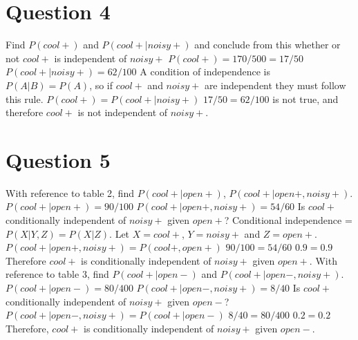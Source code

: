 \documentclass[12pt]{report}
\begin{document}
\section{Question 4}
Find $P(cool+)$ and $P(cool+|noisy+)$ and conclude from this whether or not $cool+$ is independent of $noisy+$
\newline
\newline
$P(cool+) = 170/500 = 17/50$
\newline
$P(cool+|noisy+) = 62/100$
\newline
A condition of independence is $P(A|B) = P(A)$, so if $cool+$ and $noisy+$ are independent they must follow this rule.
\newline
$P(cool+) = P(cool+|noisy+)$
\newline
$17/50 = 62/100$ is not true, and therefore $cool+$ is not independent of $noisy+$.

\section{Question 5}
With reference to table 2, find $P(cool+|open+)$, $P(cool+|open+, noisy+)$.
\newline
$P(cool+|open+)=90/100$
\newline
$P(cool+|open+,noisy+)=54/60$
\newline
Is $cool+$ conditionally independent of $noisy+$ given $open+$?
\newline
Conditional independence = $P(X|Y,Z) = P(X|Z)$.
\newline
Let $X=cool+$, $Y=noisy+$ and $Z=open+$.
\newline
$P(cool+|open+,noisy+) = P(cool+,open+)$
\newline
$90/100 = 54/60$
\newline
$0.9 = 0.9$
\newline
Therefore $cool+$ is conditionally independent of $noisy+$ given $open+$.
\newline
\newline
With reference to table 3, find $P(cool+|open-)$ and $P(cool+|open-,noisy+)$.
\newline
$P(cool+|open-) = 80/400$
\newline
$P(cool+|open-,noisy+) = 8/40$
\newline
Is $cool+$ conditionally independent of $noisy+$ given $open-$?
\newline
$P(cool+|open-,noisy+) = P(cool+|open-)$
\newline
$8/40 = 80/400$
\newline
$0.2 = 0.2$
\newline
Therefore, $cool+$ is conditionally independent of $noisy+$ given $open-$.
\end{document}
